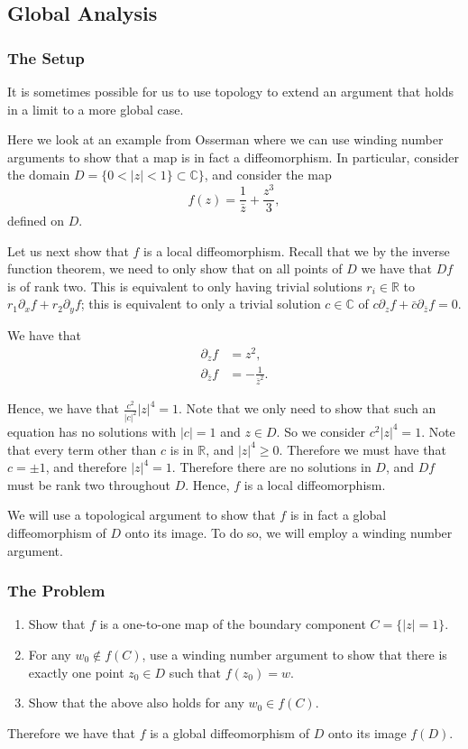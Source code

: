 \subsection{Global Analysis}
\subsubsection*{The Setup}

It is sometimes possible for us to use topology to extend an argument that holds in a limit to a more global case.

Here we look at an example from Osserman \cite{Osserman} where we can use winding number arguments to show that
a map is in fact a diffeomorphism. In particular, consider the domain \(D = \{0 < |z| < 1\} \subset \mathbb C\}\), 
and consider the map 
\begin{equation}
f(z) = \frac{1}{\bar z} + \frac{z^3}{3},
\end{equation} 
defined on \(D\). 

Let us next show that \(f\) is a local diffeomorphism. Recall that we by the inverse function theorem, we need to 
only show that on all points of \(D\) we have that \(Df\) is of rank two. This is equivalent to only having
trivial solutions \(r_i \in \mathbb R\) to \(r_1\partial_x f + r_2\partial_y f\); this is equivalent to only
a trivial solution \(c\in \mathbb C\) of \(c\partial_z f + \bar c \partial_{\bar z} f = 0\). 

We have that
\begin{align}
\partial_z f & = z^2, \\
\partial_{\bar z} f & = -\frac{1}{\bar z^2}.
\end{align}

Hence, we have that \(\frac{c^2}{|c|^2} |z|^4 = 1\). Note that we only need to show that such an equation has 
no solutions with \(|c| = 1\) and \(z \in D\). So we consider \(c^2 |z|^4 = 1\). Note that every term other than
\(c\) is in \(\mathbb R\), and \(|z|^4 \geq 0\). Therefore we must have that \(c = \pm 1\), 
and therefore \(|z|^4 = 1\). Therefore there are no solutions in \(D\), and \(Df\) must be rank two 
throughout \(D\). Hence, \(f\) is a local diffeomorphism.

We will use a topological argument to show that \(f\)
is in fact a global diffeomorphism of \(D\) onto its image. To do so, we will employ
a winding number argument.

\subsubsection*{The Problem}
\begin{enumerate}
\item Show that \(f\) is a one-to-one map of the boundary component \(C = \{|z| = 1\}\).
\item For any \(w_0 \not \in f(C)\), use a winding number argument to show that there is exactly one point
\(z_0 \in D\) such that \(f(z_0) = w\).
\item Show that the above also holds for any \(w_0 \in f(C)\).
\end{enumerate}
Therefore we have that \(f\) is a global diffeomorphism of \(D\) onto its image \(f(D)\).

